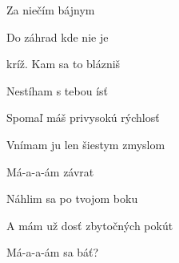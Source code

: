 \begin{song}
\bigskip

 Za niečím bájnym \par
{} Do záhrad kde nie je \par
{}kríž. Kam sa to blázniš \par
Nestíham s tebou ísť \par

\bigskip

Spomaľ máš privysokú rýchlosť \par
{}Vnímam ju len šiestym zmyslom \par
{}Má-a-a-ám závrat  \par
{}Náhlim sa po tvojom boku \par
A mám už dosť zbytočných pokút \par
{}Má-a-a-ám sa báť?  \par

\bigskip

\Outro \par
{}    \par
{}    \par

\end{song}
